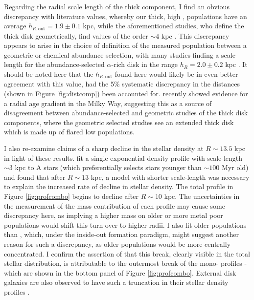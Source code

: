 Regarding the radial scale length of the thick component, I find an obvious discrepancy with literature values, whereby our thick, high \afe{}, populations have an average $h_{R, \text{out}} = 1.9 \pm 0.1  $ kpc, while the aforementioned studies, who define the thick disk geometrically, find values of the order $\sim 4$ kpc \citep{2001MNRAS.322..426O,2008ApJ...673..864J}. This discrepancy appears to arise in the choice of definition of the measured population between a geometric or chemical abundance selection, with many studies finding a scale length for the abundance-selected $\alpha$-rich disk in the range $h_R = 2.0 \pm 0.2$ kpc \citep{2016ARA&A..54..529B,2016ApJ...823...30B,2012ApJ...753..148B,2012ApJ...752...51C}. It should be noted here that the $h_{R, \text{out}}$ found here would likely be in even better agreement with this value, had the 5\% systematic discrepancy in the distances (shown in Figure \ref{fig:distcomp}) been accounted for. \citet{2016arXiv160901168M} recently showed evidence for a radial age gradient in the Milky Way, suggesting this as a source of disagreement between abundance-selected and geometric studies of the thick disk components, where the geometric selected studies see an extended thick disk which is made up of flared low \afe{} populations. 

I also re-examine claims of a sharp decline in the stellar density at $R\sim 13.5$ kpc \citep[e.g.][]{2009A&A...495..819R,2010MNRAS.402..713S} in light of these results. \citet{2010MNRAS.402..713S} fit a single exponential density profile with scale-length $\sim 3$ kpc to A stars (which preferentially selects stars younger than $\sim 100$ Myr old) and found that after $R\sim13$ kpc, a model with shorter scale-length was necessary to explain the increased rate of decline in stellar density. The total profile in Figure \ref{fig:profcombo} begins to decline after $R\sim10$ kpc. The uncertainties in the measurement of the mass contribution of each profile may cause some discrepancy here, as implying a higher mass on older or more metal poor populations would shift this turn-over to higher radii. I also fit older populations than \citet{2010MNRAS.402..713S}, which, under the inside-out formation paradigm, might suggest another reason for such a discrepancy, as older populations would be more centrally concentrated. I confirm the assertion of \citet{2016ApJ...823...30B} that this break, clearly visible in the total stellar distribution, is attributable to the outermost break of the mono-\feh{} profiles - which are shown in the bottom panel of Figure \ref{fig:profcombo}. External disk galaxies are also observed to have such a truncation in their stellar density profiles \citep[e.g.][]{2006A&A...454..759P}. 


